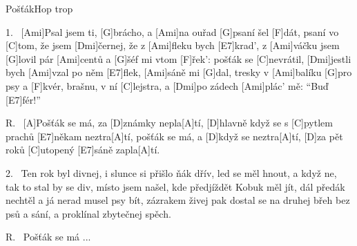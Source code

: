 \begin{song}{Pošťák}{Hop trop}

\begin{xverse}{1.~}
[\large Ami]Psal jsem ti, [\large G]brácho, a [\large Ami]na ouřad [\large G]psaní šel [\large F]dát,
psaní vo [\large C]tom, že jsem [\large Dmi]{čer}nej, že z [\large Ami]fleku bych [\large E7]krad',
z [\large Ami]váčku jsem [\large G]lovil pár [\large Ami]centů a [\large G]{šéf} mi vtom [\large F]{řek':}
pošťák se [\large C]nevrátil, [\large Dmi]jestli bych [\large Ami]vzal po něm [\large E7]flek,
[\large Ami]sáně mi [\large G]dal, tresky v [\large Ami]balíku [\large G]pro psy a [\large F]kvér,
brašnu, v ní [\large C]lejstra, a [\large Dmi]po zádech [\large Ami]plác' mě: ``Buď [\large E7]fér!''
\end{xverse}

\begin{xverse}{R.~}
[\large A]Pošťák se má, za [\large D]známky nepla[\large A]tí,
[\large D]hlavně když se s [\large C]pytlem prachů [\large E7]někam neztra[\large A]tí,
pošťák se má, a [\large D]když se neztra[\large A]tí,
[\large D]za pět roků [\large C]utopený [\large E7]sáně zapla[\large A]tí.
\end{xverse}

\begin{xverse}{2.~}
Ten rok byl divnej, i slunce si přišlo ňák dřív,
led se měl hnout, a když ne, tak to stal by se div,
místo jsem našel, kde předjíždět Kobuk měl jít,
dál předák nechtěl a já nerad musel psy bít,
zázrakem živej pak dostal se na druhej břeh
bez psů a sání, a proklínal zbytečnej spěch.
\end{xverse}

\begin{xverse}{R.~}
Pošťák se má ...
\end{xverse}

\end{song}

